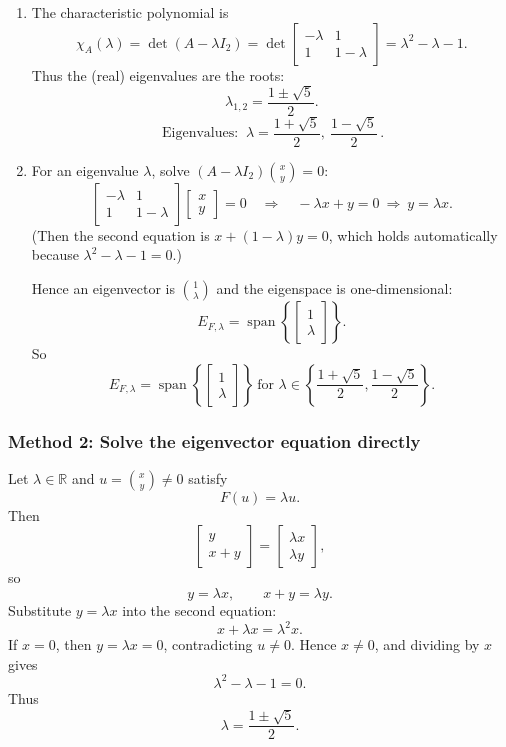\documentclass[12pt]{article}
\newcommand{\R}{\mathbb{R}}
\newcommand{\Span}{\operatorname{span}}
\begin{document}
\begin{enumerate}[label=(\alph*)]
\item The characteristic polynomial is
\[
\chi_A(\lambda)=\det(A-\lambda I_2)=
\det\begin{bmatrix}-\lambda&1\\1&1-\lambda\end{bmatrix}
=\lambda^2-\lambda-1.
\]
Thus the (real) eigenvalues are the roots:
\[
\lambda_{1,2}=\frac{1\pm \sqrt{5}}{2}.
\]
\[
\boxed{\,\text{Eigenvalues: }\ \lambda=\dfrac{1+\sqrt5}{2},\ \dfrac{1-\sqrt5}{2}\, }.
\]

\item For an eigenvalue $\lambda$, solve $(A-\lambda I_2)\binom{x}{y}=0$:
\[
\begin{bmatrix}-\lambda&1\\1&1-\lambda\end{bmatrix}\begin{bmatrix}x\\y\end{bmatrix}=0
\quad\Longrightarrow\quad
-\lambda x+y=0 \ \Rightarrow\ y=\lambda x.
\]
(Then the second equation is $x+(1-\lambda)y=0$, which holds automatically because $\lambda^2-\lambda-1=0$.)

Hence an eigenvector is $\binom{1}{\lambda}$ and the eigenspace is one-dimensional:
\[
E_{F,\lambda}=\Span\left\{\begin{bmatrix}1\\ \lambda\end{bmatrix}\right\}.
\]
So
\[
\boxed{\,
E_{F,\lambda}=\Span\left\{\begin{bmatrix}1\\ \lambda\end{bmatrix}\right\}
\ \text{for }\lambda\in\left\{\dfrac{1+\sqrt5}{2},\dfrac{1-\sqrt5}{2}\right\}.
\,}
\]
\end{enumerate}

\newpage
\subsubsection{Method 2: Solve the eigenvector equation directly}

Let $\lambda\in\R$ and $u=\binom{x}{y}\neq 0$ satisfy
\[
F(u)=\lambda u.
\]
Then
\[
\begin{bmatrix}y\\x+y\end{bmatrix}
=
\begin{bmatrix}\lambda x\\ \lambda y\end{bmatrix},
\]
so
\[
y=\lambda x,\qquad x+y=\lambda y.
\]
Substitute $y=\lambda x$ into the second equation:
\[
x+\lambda x=\lambda^2x.
\]
If $x=0$, then $y=\lambda x=0$, contradicting $u\neq 0$. Hence $x\neq 0$, and dividing by $x$ gives
\[
\lambda^2-\lambda-1=0.
\]
Thus
\[
\lambda=\frac{1\pm\sqrt5}{2}.
\]
\end{document}

